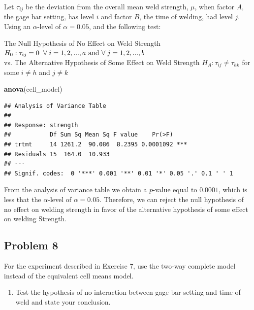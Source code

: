 \documentclass[12pt,]{article}
\newenvironment{Shaded}{\begin{snugshade}}{\end{snugshade}}
\newcommand{\KeywordTok}[1]{\textcolor[rgb]{0.13,0.29,0.53}{\textbf{#1}}}
\newcommand{\NormalTok}[1]{#1}
\providecommand{\tightlist}{%
  \setlength{\itemsep}{0pt}\setlength{\parskip}{0pt}}
\begin{document}
Let \(\tau_{ij}\) be the deviation from the overall mean weld strength,
\(\mu\), when factor \(A\), the gage bar setting, has level \(i\) and
factor \(B\), the time of welding, had level \(j\). Using an
\(\alpha\)-level of \(\alpha = 0.05\), and the following test:

\begin{center}
 The Null Hypothesis of No Effect on Weld Strength  
 $H_0 : \tau_{ij} = 0 \hspace{.2cm }\forall \hspace{.1cm} i=1,2,...,a \text{ and }\forall  \hspace{.1cm} j=1,2,...,b$ \\
 vs. The Alternative Hypothesis of Some Effect on Weld Strength $H_A : \tau_{ij} \neq \tau_{hk}$ for some $i\neq h$ and $j\neq k$ 
\end{center}

\begin{Shaded}
\begin{Highlighting}[]
\KeywordTok{anova}\NormalTok{(cell_model)}
\end{Highlighting}
\end{Shaded}

\begin{verbatim}
## Analysis of Variance Table
## 
## Response: strength
##           Df Sum Sq Mean Sq F value    Pr(>F)    
## trtmt     14 1261.2  90.086  8.2395 0.0001092 ***
## Residuals 15  164.0  10.933                      
## ---
## Signif. codes:  0 '***' 0.001 '**' 0.01 '*' 0.05 '.' 0.1 ' ' 1
\end{verbatim}

From the analysis of variance table we obtain a \(p\)-value equal to
\(0.0001\), which is less that the \(\alpha\)-level of
\(\alpha = 0.05\). Therefore, we can reject the null hypothesis of no
effect on welding strength in favor of the alternative hypothesis of
some effect on welding Strength.

\subsection{Problem 8}\label{problem-8}

For the experiment described in Exercise 7, use the two-way complete
model instead of the equivalent cell means model.

\begin{enumerate}
\def\labelenumi{(\alph{enumi})}
\tightlist
\item
  Test the hypothesis of no interaction between gage bar setting and
  time of weld and state your conclusion.
\end{enumerate}
\end{document}
